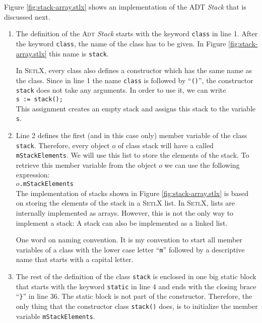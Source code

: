 Figure \ref{fig:stack-array.stlx} shows an implementation of the ADT \textsl{Stack} that is 
discussed next.
\begin{enumerate}
\item The definition of the \textsc{Adt} \textsl{Stack} starts with the keyword \texttt{class}
      in line 1.
      After the keyword \texttt{class}, the name of the class has to be given.  In Figure
      \ref{fig:stack-array.stlx} this name is \texttt{stack}.

      In \textsc{SetlX}, every class also defines a constructor which has the same name as the class.
      Since in line 1 the name \texttt{class} is followed by ``\texttt{()}'', the constructor
      \texttt{stack} does not take any arguments.  In order to use it, we can write
      \\[0.2cm]
      \hspace*{1.3cm}
      \texttt{s := stack();}
      \\[0.2cm]
      This assignment creates an empty stack and assigns this stack to the variable \texttt{s}.
\item Line 2 defines the first (and in this case only) member variable of the class \texttt{stack}.
      Therefore, every object $o$ of class stack will have a  called
      \texttt{mStackElements}. 
      We will use this list to store the elements of the stack.  To retrieve this member variable from
      the object $o$ we can use the following expression:
      \\[0.2cm]
      \hspace*{1.3cm}
      $o$\texttt{.mStackElements}
      \\[0.2cm]
      The implementation of stacks shown
      in Figure \ref{fig:stack-array.stlx} is based on storing the elements of the stack in a
      \textsc{SetlX} list.  In \textsc{SetlX}, lists are internally implemented as arrays.  However,
      this is not the only way to implement a stack: A stack can also be implemented as a linked list.

      One word on naming convention.  It is my convention to start all member variables of a class
      with the lower case letter ``\texttt{m}'' followed by a descriptive name that starts with a 
      capital letter.
\item The rest of the definition of the class \texttt{stack} is enclosed in one big static
      block that starts with the keyword \texttt{static} in line 4 and ends with the closing brace 
      ``\texttt{\}}'' in line 36.  The static block is not part of the constructor.
      Therefore, the only thing that the constructor class
      \texttt{stack()} does, is to initialize the member variable \texttt{mStackElements}.


\end{enumerate}
